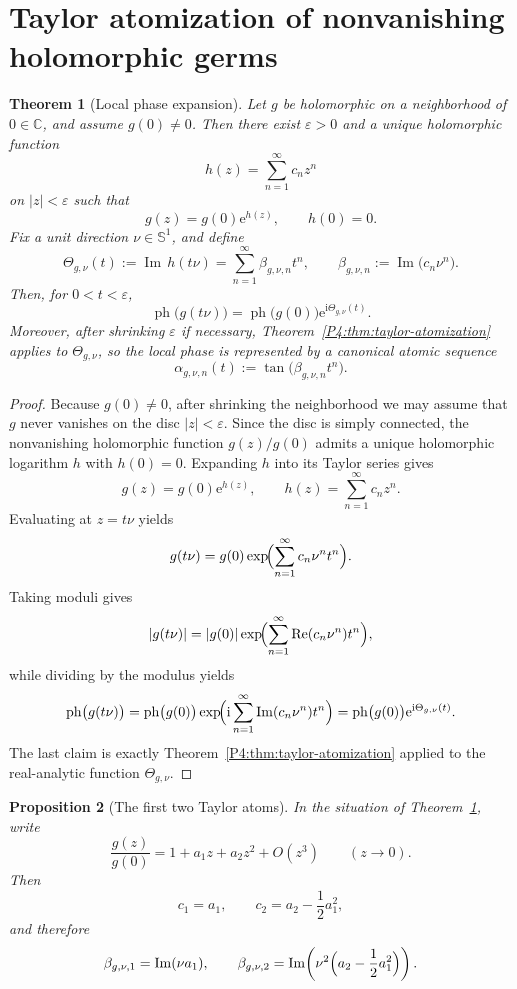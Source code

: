 \documentclass[11pt,a4paper]{article}
\numberwithin{equation}{section}
\newtheorem{theorem}{Theorem}[section]
\newtheorem{proposition}[theorem]{Proposition}
\theoremstyle{definition}
\theoremstyle{remark}
\DeclareMathOperator{\Rea}{Re}
\DeclareMathOperator{\Ima}{Im}
\newcommand{\CC}{\mathbb C}
\newcommand{\Sph}{\mathbb S^1}
\newcommand{\ph}{\operatorname{ph}}
\newcommand{\e}{\mathrm e}
\newcommand{\ii}{\mathrm i}
\begin{document}
\section{Taylor atomization of nonvanishing holomorphic germs}

\begin{theorem}[Local phase expansion]\label{P4:thm:nonvanishing-germ}
Let $g$ be holomorphic on a neighborhood of $0\in\CC$, and assume $g(0)\neq0$.  Then there exist $\varepsilon>0$ and a unique holomorphic function
\[
h(z)=\sum_{n=1}^{\infty} c_n z^n
\]
on $|z|<\varepsilon$ such that
\[
g(z)=g(0)\e^{h(z)},
\qquad h(0)=0.
\]
Fix a unit direction $\nu\in\Sph$, and define
\[
\Theta_{g,\nu}(t):=\Ima\,h(t\nu)
=\sum_{n=1}^{\infty}\beta_{g,\nu,n} t^n,
\qquad
\beta_{g,\nu,n}:=\Ima\bigl(c_n\nu^n\bigr).
\]
Then, for $0<t<\varepsilon$,
\[
\ph\bigl(g(t\nu)\bigr)=\ph\bigl(g(0)\bigr)\e^{\ii\Theta_{g,\nu}(t)}.
\]
Moreover, after shrinking $\varepsilon$ if necessary, Theorem~\ref{P4:thm:taylor-atomization} applies to $\Theta_{g,\nu}$, so the local phase is represented by a canonical atomic sequence
\[
\alpha_{g,\nu,n}(t):=\tan\bigl(\beta_{g,\nu,n}t^n\bigr).
\]
\end{theorem}

\begin{proof}
Because $g(0)\neq0$, after shrinking the neighborhood we may assume that $g$ never vanishes on the disc $|z|<\varepsilon$.  Since the disc is simply connected, the nonvanishing holomorphic function $g(z)/g(0)$ admits a unique holomorphic logarithm $h$ with $h(0)=0$.  Expanding $h$ into its Taylor series gives
\[
g(z)=g(0)\e^{h(z)},
\qquad
h(z)=\sum_{n=1}^{\infty} c_n z^n.
\]
Evaluating at $z=t\nu$ yields
\[
g(t\nu)=g(0)\exp\!\Bigl(\sum_{n=1}^{\infty} c_n\nu^n t^n\Bigr).
\]
Taking moduli gives
\[
|g(t\nu)|=|g(0)|\exp\!\Bigl(\sum_{n=1}^{\infty}\Rea(c_n\nu^n)t^n\Bigr),
\]
while dividing by the modulus yields
\[
\ph\bigl(g(t\nu)\bigr)=\ph\bigl(g(0)\bigr)\exp\!\Bigl(\ii\sum_{n=1}^{\infty}\Ima(c_n\nu^n)t^n\Bigr)
=\ph\bigl(g(0)\bigr)\e^{\ii\Theta_{g,\nu}(t)}.
\]
The last claim is exactly Theorem~\ref{P4:thm:taylor-atomization} applied to the real-analytic function $\Theta_{g,\nu}$.
\end{proof}

\begin{proposition}[The first two Taylor atoms]\label{P4:prop:first-two-atoms}
In the situation of Theorem~\ref{P4:thm:nonvanishing-germ}, write
\[
\frac{g(z)}{g(0)}=1+a_1 z+a_2 z^2+O(z^3)
\qquad (z\to0).
\]
Then
\[
c_1=a_1,
\qquad
c_2=a_2-\frac12 a_1^2,
\]
and therefore
\[
\beta_{g,\nu,1}=\Ima(\nu a_1),
\qquad
\beta_{g,\nu,2}=\Ima\!\left(\nu^2\Bigl(a_2-\frac12 a_1^2\Bigr)\right).
\]
\end{proposition}
\end{document}
